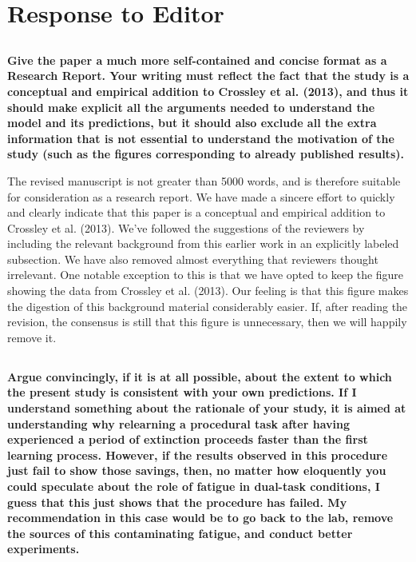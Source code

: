 \documentclass[10pt,a4paper]{article}
\begin{document}
\section{Response to Editor}
\subsection{} \textbf{Give the paper a much more self-contained and concise
format as a Research Report. Your writing must reflect the fact that the study
is a conceptual and empirical addition to Crossley et al. (2013), and thus it
should make explicit all the arguments needed to understand the model and its
predictions, but it should also exclude all the extra information that is not
essential to understand the motivation of the study (such as the figures
corresponding to already published results).}

The revised manuscript is not greater than 5000 words, and is therefore suitable
for consideration as a research report. We have made a sincere effort to quickly
and clearly indicate that this paper is a conceptual and empirical addition to
Crossley et al. (2013). We've followed the suggestions of the reviewers by
including the relevant background from this earlier work in an explicitly
labeled subsection. We have also removed almost everything that reviewers
thought irrelevant. One notable exception to this is that we have opted to keep
the figure showing the data from Crossley et al. (2013). Our feeling is that
this figure makes the digestion of this background material considerably easier.
If, after reading the revision, the consensus is still that this figure is
unnecessary, then we will happily remove it.


\subsection{} \textbf{Argue convincingly, if it is at all possible, about the
extent to which the present study is consistent with your own predictions. If I
understand something about the rationale of your study, it is aimed at
understanding why relearning a procedural task after having experienced a period
of extinction proceeds faster than the first learning process. However, if the
results observed in this procedure just fail to show those savings, then, no
matter how eloquently you could speculate about the role of fatigue in dual-task
conditions, I guess that this just shows that the procedure has failed. My
recommendation in this case would be to go back to the lab, remove the sources
of this contaminating fatigue, and conduct better experiments.}
\end{document}
